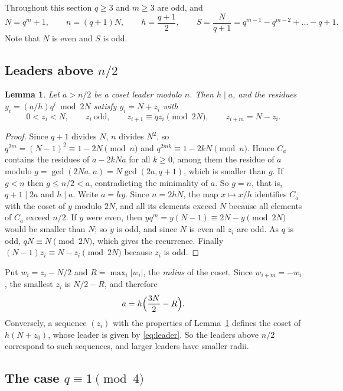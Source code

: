 \documentclass[11pt]{amsart}
\newtheorem{lemma}[theorem]{Lemma}
\theoremstyle{remark}
\begin{document}
Throughout this section $q\ge3$ and $m\ge3$ are odd, and
\[
N=q^m+1,\qquad n=(q+1)N,\qquad h=\frac{q+1}2,\qquad S=\frac N{q+1}=q^{m-1}-q^{m-2}+\dots-q+1 .
\]
Note that $N$ is even and $S$ is odd.

\subsection{Leaders above $n/2$}

\begin{lemma}\label{lem:reduction}
Let $a>n/2$ be a coset leader modulo $n$.
Then $h\mid a$, and the residues $y_i=(a/h)q^i\bmod 2N$ satisfy $y_i=N+z_i$ with
\[
0<z_i<N,\qquad z_i\ \text{odd},\qquad z_{i+1}\equiv qz_i\pmod{2N},\qquad z_{i+m}=N-z_i .
\]
\end{lemma}

\begin{proof}
Since $q+1$ divides $N$, $n$ divides $N^2$, so $q^{2m}=(N-1)^2\equiv1-2N\pmod n$ and $q^{2mk}\equiv1-2kN\pmod n$.
Hence $C_a$ contains the residues of $a-2kNa$ for all $k\ge0$, among them the residue of $a$ modulo $g=\gcd(2Na,n)=N\gcd(2a,q+1)$, which is smaller than $g$.
If $g<n$ then $g\le n/2<a$, contradicting the minimality of $a$.
So $g=n$, that is, $q+1\mid 2a$ and $h\mid a$.
Write $a=hy$.
Since $n=2hN$, the map $x\mapsto x/h$ identifies $C_a$ with the coset of $y$ modulo $2N$, and all its elements exceed $N$ because all elements of $C_a$ exceed $n/2$.
If $y$ were even, then $yq^m=y(N-1)\equiv 2N-y\pmod{2N}$ would be smaller than $N$; so $y$ is odd, and since $N$ is even all $z_i$ are odd.
As $q$ is odd, $qN\equiv N\pmod{2N}$, which gives the recurrence.
Finally $(N-1)z_i\equiv N-z_i\pmod{2N}$ because $z_i$ is odd.
\end{proof}

Put $w_i=z_i-N/2$ and $R=\max_i|w_i|$, the \emph{radius} of the coset.
Since $w_{i+m}=-w_i$, the smallest $z_i$ is $N/2-R$, and therefore
\begin{equation}\label{eq:leader}
a=h\Bigl(\frac{3N}2-R\Bigr).
\end{equation}
Conversely, a sequence $(z_i)$ with the properties of Lemma~\ref{lem:reduction} defines the coset of $h(N+z_0)$, whose leader is given by \eqref{eq:leader}.
So the leaders above $n/2$ correspond to such sequences, and larger leaders have smaller radii.

\subsection{The case $q\equiv1\pmod4$}
\end{document}
